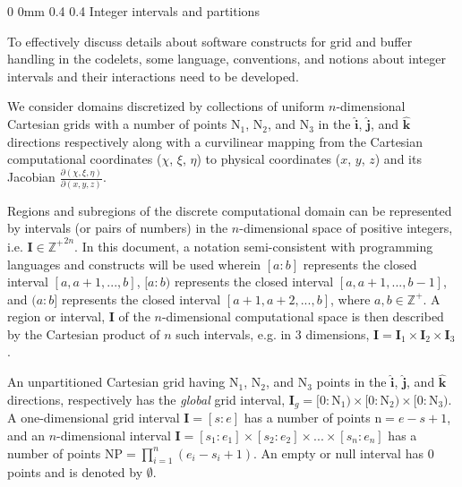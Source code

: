 \documentclass[11pt]{article}
\makeatletter
\renewcommand{\section}{\@startsection
{section}%
{0}%
{0mm}%
{0.4\baselineskip}%
{0.4\baselineskip}%
{\normalfont\Large\bfseries\color{myBrown}}}%
\makeatother
\begin{document}
\newpage

\appendix

\section{Integer intervals and partitions}\label{appendix:intervals}

To effectively discuss details about software constructs for grid and buffer handling in the codelets, some language, conventions, and notions about integer intervals and their interactions need to be developed. 

We consider domains discretized by collections of uniform $n$-dimensional Cartesian grids with a number of points $\text{N}_1$, $\text{N}_2$, and $\text{N}_3$ in the $\mathbf{\hat{i}}$, $\mathbf{\hat{j}}$, and $\mathbf{\hat{k}}$ directions respectively along with a curvilinear mapping  from the Cartesian computational coordinates ($\chi$, $\xi$, $\eta$) to physical coordinates ($x$, $y$, $z$) and its Jacobian $\frac{\partial(\chi,\xi,\eta)}{\partial(x,y,z)}$. 

Regions and subregions of the discrete computational domain can be represented by intervals (or pairs of numbers) in the $n$-dimensional space of positive integers, i.e. $\textbf{I}\in\mathbb{Z^+}^{2n}$. In this document, a notation semi-consistent with programming languages and constructs will be used wherein $[a:b]$ represents the closed interval $[a, a+1, ..., b]$, $[a:b)$ represents the closed interval $[a, a+1, ..., b-1]$, and $(a:b]$ represents the closed interval $[a+1, a+2, ..., b]$, where $a,b\in\mathbb{Z^+}$. A region or interval, $\textbf{I}$ of the $n$-dimensional computational space is then described by the Cartesian product of $n$ such intervals, e.g. in 3 dimensions, $\textbf{I} = \textbf{I}_1\times\textbf{I}_2\times\textbf{I}_3$.   

An unpartitioned Cartesian grid having $\text{N}_1$, $\text{N}_2$, and $\text{N}_3$ points in the $\mathbf{\hat{i}}$, $\mathbf{\hat{j}}$, and $\mathbf{\hat{k}}$ directions, respectively has the \textit{global} grid interval, $\textbf{I}_{g} = [0:\text{N}_1)\times[0:\text{N}_2)\times[0:\text{N}_3)$. A one-dimensional grid interval $\textbf{I} = [s:e]$ has a number of points $\text{n} = e - s + 1$, and an $n$-dimensional interval $\textbf{I} = [s_1:e_1]\times[s_2:e_2]\times...\times[s_n:e_n]$ has a number of points $\text{NP} = \prod_{i=1}^{n} (e_i - s_i + 1)$. An empty or null interval has $0$ points and is denoted by $\mathbf{\emptyset}$.
\end{document}
